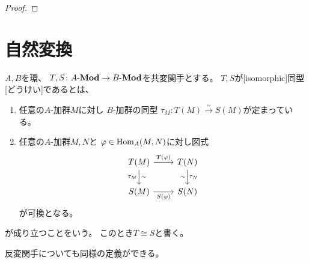 \documentclass[report]{jlreq}
\begin{document}
\begin{proof}
    \TODO{}
\end{proof}



%
\section{自然変換}

\begin{definition}[自然変換]
    \TODO{}
\end{definition}

\begin{definition}[関手の同型]
    $A, B$を環、
    $T, S \colon A\text{-}\mathbf{Mod} \to B\text{-}\mathbf{Mod}$を共変関手とする。
    $T, S$が[isomorphic]{同型}[どうけい]であるとは、
    \begin{enumerate}
        \item 任意の$A$-加群$M$に対し
            $B$-加群の同型
            $\tau_M \colon T(M) \overset{\sim}{\to} S(M)$が定まっている。
        \item 任意の$A$-加群$M, N$と
            $\varphi \in \operatorname{Hom}_A(M, N)$に対し図式
            \begin{equation}
                \begin{tikzcd}
                    T(M) \ar{d}[swap]{\tau_M}{\sim} \ar{r}{T(\varphi)}
                        & T(N) \ar{d}{\tau_N}[swap]{\sim} \\
                    S(M) \ar{r}[swap]{S(\varphi)}
                        & S(N)
                \end{tikzcd}
            \end{equation}
            が可換となる。
    \end{enumerate}
    が成り立つことをいう。
    このとき$T \cong S$と書く。
\end{definition}

\begin{remark}
    反変関手についても同様の定義ができる。
\end{remark}
\end{document}
